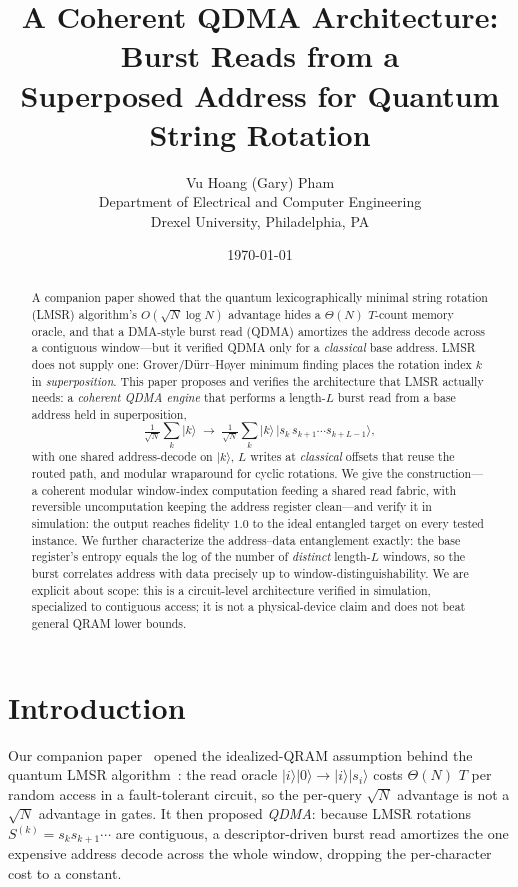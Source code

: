 \documentclass[11pt]{article}
\title{\textbf{A Coherent QDMA Architecture: Burst Reads from a\\
Superposed Address for Quantum String Rotation}}
\author{Vu Hoang (Gary) Pham\\[2pt]
\normalsize Department of Electrical and Computer Engineering\\
\normalsize Drexel University, Philadelphia, PA}
\date{\today}
\theoremstyle{definition}
\begin{document}
\maketitle

\begin{abstract}
A companion paper showed that the quantum lexicographically minimal string
rotation (LMSR) algorithm's $O(\sqrt{N}\log N)$ advantage hides a $\Theta(N)$
$T$-count memory oracle, and that a DMA-style burst read (QDMA) amortizes the
address decode across a contiguous window---but it verified QDMA only for a
\emph{classical} base address. LMSR does not supply one: Grover/D\"urr--H\o yer
minimum finding places the rotation index $k$ in \emph{superposition}. This paper
proposes and verifies the architecture that LMSR actually needs: a \emph{coherent
QDMA engine} that performs a length-$L$ burst read from a base address held in
superposition,
\[
  \tfrac{1}{\sqrt N}\!\sum_k \lvert k\rangle
  \;\longrightarrow\;
  \tfrac{1}{\sqrt N}\!\sum_k \lvert k\rangle\,
  \lvert s_k\,s_{k+1}\cdots s_{k+L-1}\rangle ,
\]
with one shared address-decode on $\lvert k\rangle$, $L$ writes at \emph{classical}
offsets that reuse the routed path, and modular wraparound for cyclic rotations.
We give the construction---a coherent modular window-index computation feeding a
shared read fabric, with reversible uncomputation keeping the address register
clean---and verify it in simulation: the output reaches fidelity $1.0$ to the
ideal entangled target on every tested instance. We further characterize the
address--data entanglement exactly: the base register's entropy equals the
log of the number of \emph{distinct} length-$L$ windows, so the burst correlates
address with data precisely up to window-distinguishability. We are explicit about
scope: this is a circuit-level architecture verified in simulation, specialized to
contiguous access; it is not a physical-device claim and does not beat general
QRAM lower bounds.
\end{abstract}

\section{Introduction}
\label{sec:intro}
Our companion paper~\cite{pham2026qramcost} opened the idealized-QRAM assumption
behind the quantum LMSR algorithm~\cite{pham2025lmsr}: the read oracle
$\lvert i\rangle\lvert 0\rangle\to\lvert i\rangle\lvert s_i\rangle$ costs
$\Theta(N)$ $T$ per random access in a fault-tolerant circuit, so the per-query
$\sqrt N$ advantage is not a $\sqrt N$ advantage in gates. It then proposed
\emph{QDMA}: because LMSR rotations $S^{(k)}=s_k s_{k+1}\cdots$ are contiguous, a
descriptor-driven burst read amortizes the one expensive address decode across the
whole window, dropping the per-character cost to a constant.
\end{document}
